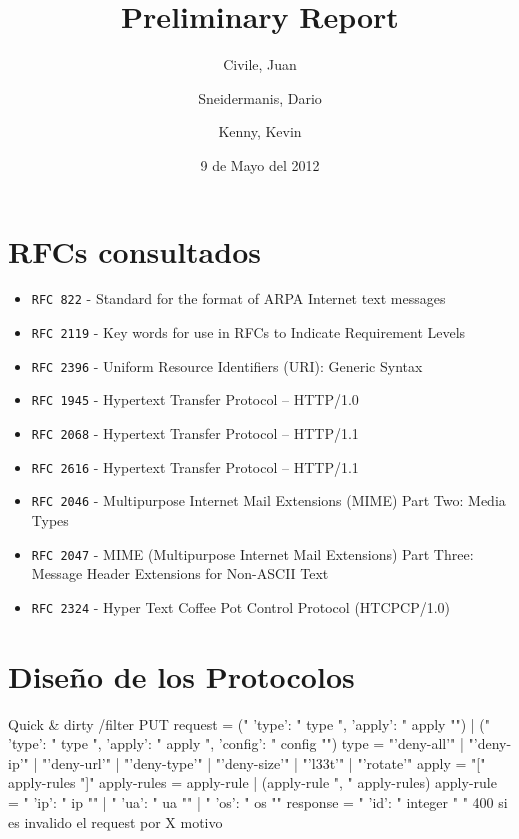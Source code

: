 \documentclass[11pt,a4paper,titlepage]{article}
\title{Preliminary Report}
\author{Civile, Juan \and Sneidermanis, Dario \and Kenny, Kevin}
\date{9 de Mayo del 2012}
\begin{document}
\newcommand{\awesome}[1]{\texttt{\large #1}}
\newcommand{\ua}{\textit{User Agent} }
\newcommand{\os}{\textit{Origin Server} }

\maketitle
\tableofcontents
\clearpage

\section{RFCs consultados}

\begin{itemize}

    \item \awesome{RFC 822}  - Standard for the format of ARPA Internet text messages
    \item \awesome{RFC 2119} - Key words for use in RFCs to Indicate Requirement Levels
    \item \awesome{RFC 2396} - Uniform Resource Identifiers (URI): Generic Syntax
    \item \awesome{RFC 1945} - Hypertext Transfer Protocol -- HTTP/1.0
    \item \awesome{RFC 2068} - Hypertext Transfer Protocol -- HTTP/1.1
    \item \awesome{RFC 2616} - Hypertext Transfer Protocol -- HTTP/1.1
    \item \awesome{RFC 2046} - Multipurpose Internet Mail Extensions (MIME) Part Two: Media Types
    \item \awesome{RFC 2047} - MIME (Multipurpose Internet Mail Extensions) Part Three: Message Header Extensions for Non-ASCII Text
    \item \awesome{RFC 2324} - Hyper Text Coffee Pot Control Protocol (HTCPCP/1.0)

\end{itemize}

\section{Diseño de los Protocolos}
Quick & dirty
/filter
PUT 
request = ("{ 'type': " type ", 'apply': " apply "}") | ("{ 'type': " type ", 'apply': " apply ", 'config': " config "}")
type = "'deny-all'" | "'deny-ip'" | "'deny-url'" | "'deny-type'" | "'deny-size'" | "'l33t'" | "'rotate'"
apply = "[" apply-rules "]"
apply-rules = apply-rule | (apply-rule ", " apply-rules)
apply-rule = "{ 'ip': " ip "}" | "{ 'ua': " ua "}" | "{ 'os': " os "}"
response = "{ 'id': " integer " }"
400 si es invalido el request por X motivo
\end{document}

